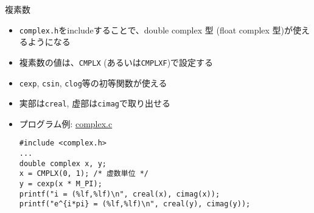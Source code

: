 \begin{frame}[t,fragile]{複素数}
  \begin{itemize}
  \item {\tt complex.h}をincludeすることで、double complex 型 (float complex 型)が使えるようになる
  \item 複素数の値は、{\tt CMPLX} (あるいは{\tt CMPLXF})で設定する
  \item {\tt cexp}, {\tt csin}, {\tt clog}等の初等関数が使える
  \item 実部は{\tt creal}, 虚部は{\tt cimag}で取り出せる
  \item プログラム例: \href{https://github.com/todo-group/computer-experiments/blob/master/exercise/basics/complex.c}{complex.c}
\begin{lstlisting}
#include <complex.h>
...
double complex x, y;
x = CMPLX(0, 1); /* 虚数単位 */
y = cexp(x * M_PI);
printf("i = (%lf,%lf)\n", creal(x), cimag(x));
printf("e^{i*pi} = (%lf,%lf)\n", creal(y), cimag(y));
\end{lstlisting}
  \end{itemize}
\end{frame}
